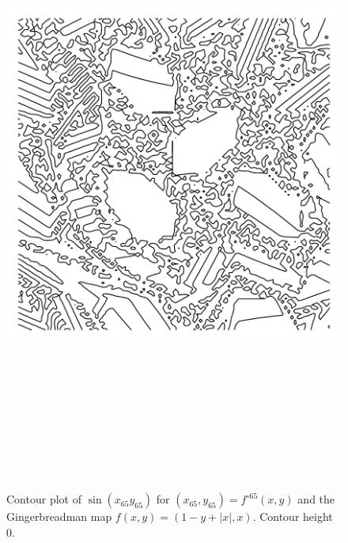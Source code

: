 \documentclass[12pt, a4paper]{amsart}
\begin{document}
\begin{figure}[!ht] 
\includegraphics[width=160mm, height=210mm]{images/gingerbreadman.pdf}
\caption{
Contour plot of $\sin(x_{65} y_{65})$ for $(x_{65}, y_{65}) = f^{\circ 65}(x, y)$ and the Gingerbreadman map $f(x, y) = (1 - y + |x|, x)$.
Contour height 0.
}
\end{figure}
\pagebreak
\end{document}
